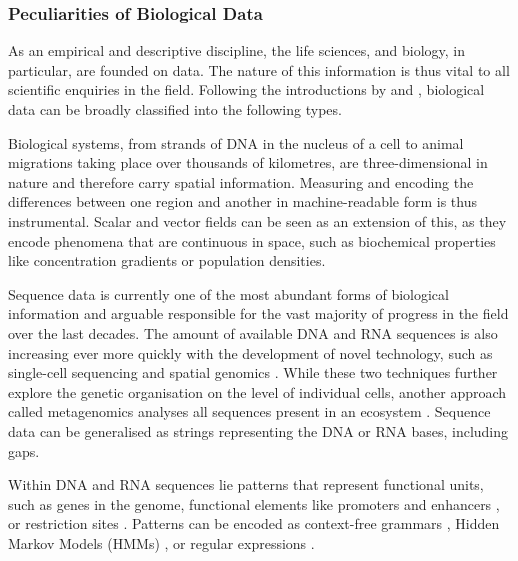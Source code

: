 \subsubsection{Peculiarities of Biological Data}\label{subsubsec:biodata}
As an empirical and descriptive discipline, the life sciences, and biology, in
particular, are founded on data. The nature of this information is thus vital
to all scientific enquiries in the field. Following the introductions by
\citet{Jagadish2003} and \citet{Wooley2006}, biological data can be broadly
classified into the following types.
\medbreak

\noindent
Biological\label{mar:dataspatial} systems, from
strands of DNA in the nucleus of a cell to animal migrations taking place over
thousands of kilometres, are three-dimensional in nature and therefore carry
spatial information. Measuring and encoding the differences between one region
and another in machine-readable form is thus instrumental. Scalar and vector
fields can be seen as an extension of this, as they encode phenomena that are
continuous in space, such as biochemical properties like concentration
gradients or population densities.
\medbreak

\noindent
Sequence data\label{mar:dataseq} is currently one of
the most abundant forms of biological information and arguable responsible for
the vast majority of progress in the field over the last decades. The amount
of available DNA and RNA sequences is also increasing ever more quickly with
the development of novel technology, such as single-cell sequencing \citep{%
Wang2015} and spatial genomics \citep{Turczyk2020}. While these two techniques
further explore the genetic organisation on the level of individual cells,
another approach called metagenomics analyses all sequences present in an
ecosystem \citep{Venter2004,Hugenholtz2008}. Sequence data can be generalised
as strings representing the DNA or RNA bases, including gaps.
\medbreak

\noindent
Within\label{mar:datapatterns} DNA and RNA sequences lie
patterns that represent functional units, such as genes in the genome,
functional elements like promoters and enhancers \citep{Kim2015a}, or
restriction sites \citep{Smith1976}. Patterns can be encoded as context-free
grammars \citep{Hopcroft2001}, Hidden Markov Models (HMMs) \citep{Stamp2021},
or regular expressions \citep{Wang2019}.
\medbreak

